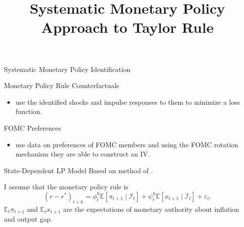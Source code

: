 \documentclass[10pt,aspectratio=169]{beamer}
\title{{\Large Systematic Monetary Policy Approach to Taylor Rule}}
\begin{document}
\begin{frame}
    \titlepage
\end{frame}



\begin{frame}
\end{frame}


\begin{frame}{Systematic Monetary Policy Identification}    
    \begin{block}{Monetary Policy Rule Counterfactuals}
        \begin{itemize}
            \item \cite{McKayWolf2023, BarnichonMesters2023} use the identified shocks and impulse responses to them to minimize a loss function. 
        \end{itemize}
    \end{block}
    \begin{block}{FOMC Preferences}
        \begin{itemize}
            \item  \cite{HIM2023} use \cite{Istrefi2019} data on preferences of FOMC members and using the FOMC rotation mechanism they are able to construct an IV. 
        \end{itemize}
    \end{block}
\end{frame}





\begin{frame}
\end{frame}
    


\begin{frame}{State-Dependent LP Model}
    Based on method of \cite{HIM2023}.

    I assume that the monetary policy rule is 
    \[\left(r-r^*\right)_{t+h}=\phi_t^h\mathbb{E}\left[\pi_{t+1}\mid \mathcal{I}_t\right]+\psi_t^h\mathbb{E}\left[x_{t+1}\mid \mathcal{I}_t\right]+\varepsilon_t.\]
    $\mathbb{E}_t\pi_{t+1}$ and $\mathbb{E}_t x_{t+1}$ are the expectations of monetary authority about inflation and output gap. 
\end{frame}
\end{document}
